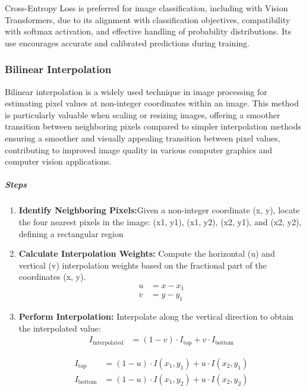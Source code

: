Cross-Entropy Loss is preferred for image classification, including with Vision Transformers, due to its alignment with classification objectives, compatibility with softmax activation, and effective handling of probability distributions. Its use encourages accurate and calibrated predictions during training.

\subsubsection{Bilinear Interpolation }
Bilinear interpolation is a widely used technique in image processing for estimating pixel values at non-integer coordinates within an image. This method is particularly valuable when scaling or resizing images, offering a smoother transition between neighboring pixels compared to simpler interpolation methods ensuring a smoother and visually appealing transition between pixel values, contributing to improved image quality in various computer graphics and computer vision applications.
\subparagraph{Steps}
\begin{enumerate}
    \item \textbf{Identify Neighboring Pixels:}Given a non-integer coordinate (x, y), locate the four nearest pixels in the image: (x1, y1), (x1, y2), (x2, y1), and (x2, y2), defining a rectangular region

    \item \textbf{Calculate Interpolation Weights:} Compute the horizontal (u) and vertical (v) interpolation weights based on the fractional part of the coordinates (x, y).
          \begin{align}
              u & = x - x_1 \label{eq:u_equation} \\
              v & = y - y_1 \label{eq:v_equation}
          \end{align}


    \item \textbf{Perform Interpolation:} Interpolate along the vertical direction to obtain the interpolated value:
          \begin{align}
              I_{\text{interpolated}} & = (1 - v) \cdot I_{\text{top}} + v \cdot I_{\text{bottom}} \label{eq:interpolated_equation}
          \end{align}


          \begin{align}
              I_{\text{top}}    & = (1 - u) \cdot I(x_1, y_1) + u \cdot I(x_2, y_1) \label{eq:itop_equation}    \\
              I_{\text{bottom}} & = (1 - u) \cdot I(x_1, y_2) + u \cdot I(x_2, y_2) \label{eq:ibottom_equation}
          \end{align}


\end{enumerate}
\newpage